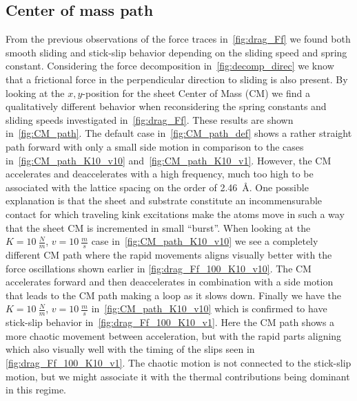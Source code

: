 \subsection{Center of mass path}
From the previous observations of the force traces in~\cref{fig:drag_Ff} we found both smooth sliding and stick-slip behavior depending on the sliding speed and spring constant. Considering the force
decomposition in~\cref{fig:decomp_direc} we know that a frictional force in
the perpendicular direction to sliding is also present. By looking at the
$x,y$-position for the sheet Center of Mass (\acrshort{CM}) we find a qualitatively different behavior when reconsidering the spring constants and sliding speeds investigated in~\cref{fig:drag_Ff}. These results are shown in~\cref{fig:CM_path}. The default case in~\cref{fig:CM_path_def} shows a rather straight path forward with
only a small side motion in comparison to the cases in~\cref{fig:CM_path_K10_v10} and~\cref{fig:CM_path_K10_v1}. However, the \acrshort{CM} accelerates and deaccelerates with a high frequency, much too high
to be associated with the lattice spacing on the order of \SI{2.46}{Å}. One possible explanation is that the sheet and substrate
constitute an incommensurable contact for which traveling kink excitations make
the atoms move in such a way that the sheet \acrshort{CM} is incremented in small ``burst''. When looking at the $K = \SI{10}{\frac{N}{m}}$, $v =
\SI{10}{\frac{m}{s}}$ case in~\cref{fig:CM_path_K10_v10} we see a completely
different \acrshort{CM} path where the rapid movements aligns visually better with
the force oscillations shown earlier in \cref{fig:drag_Ff_100_K10_v10}. The
\acrshort{CM} accelerates forward and then deaccelerates in combination with a
side motion that leads to the \acrshort{CM} path making a loop as it slows down.
Finally we have the $K = \SI{10}{\frac{N}{m}}$, $v = \SI{10}{\frac{m}{s}}$ in~\cref{fig:CM_path_K10_v10} which is confirmed to have stick-slip behavior in~\cref{fig:drag_Ff_100_K10_v1}. Here the \acrshort{CM} path shows a more chaotic
movement between acceleration, but with the rapid parts aligning  which also visually well with the timing of the slips seen in \cref{fig:drag_Ff_100_K10_v1}. The chaotic motion is not connected to the stick-slip motion, but we might associate it with the thermal contributions being dominant in this regime. 



